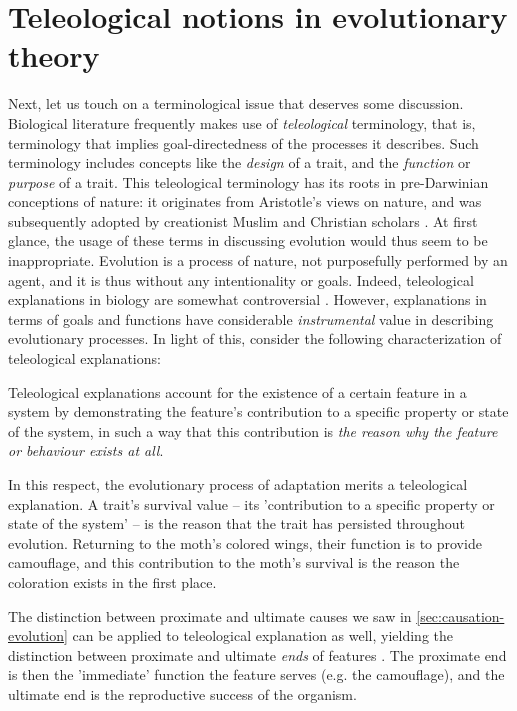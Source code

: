 \section{Teleological notions in evolutionary theory}
\label{sec:teleology}
Next, let us touch on a terminological issue that deserves some discussion.
Biological literature frequently makes use of \emph{teleological} terminology, that is, terminology that implies goal-directedness of the processes it describes. Such terminology includes concepts like the \emph{design} of a trait, and the \emph{function} or \emph{purpose} of a trait.
This teleological terminology has its roots in pre-Darwinian conceptions of nature: it originates from Aristotle's views on nature, and was subsequently adopted by creationist Muslim and Christian scholars \citep{Johnson05}.
At first glance, the usage of these terms in discussing evolution would thus seem to be inappropriate. Evolution is a process of nature, not purposefully performed by an agent, and it is thus without any intentionality or goals.
Indeed, teleological explanations in biology are somewhat controversial \citep[see][p.~27 for discussion]{Ayala99}.
However, explanations in terms of goals and functions have considerable \emph{instrumental} value in describing evolutionary processes. In light of this, consider the following characterization of teleological explanations:
\begin{quoting}
    Teleological explanations account for the existence of a certain feature in a system by demonstrating the feature’s contribution to a specific property or state of the system, in such a way that this contribution is \emph{the reason why the feature or behaviour exists at all}.
    \hfill \citep[p.~13]{Ayala99}
\end{quoting}
In this respect, the evolutionary process of adaptation merits a teleological explanation. A trait's survival value -- its 'contribution to a specific property or state of the system' -- is the reason that the trait has persisted throughout evolution. Returning to the moth's colored wings, their function is to provide camouflage, and this contribution to the moth's survival is the reason the coloration exists in the first place.

The distinction between proximate and ultimate causes we saw in \cref{sec:causation-evolution} can be applied to teleological explanation as well, yielding the distinction between proximate and ultimate \emph{ends} of features \citep[p.~18]{Ayala99}. The proximate end is then the 'immediate' function the feature serves (e.g. the camouflage), and the ultimate end is the reproductive success of the organism.

